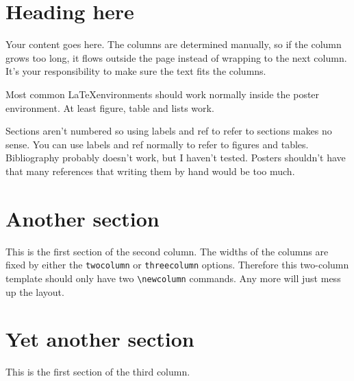 \documentclass[final]{beamer}
\author{First Author$^1$, \\ Second Author$^2$}
\institute{$^1$Some Institute, \url{email.address@institute}, \\ $^2$Another Institute}
\begin{document}
\begin{poster}

\newcolumn

\section{Heading here}
Your content goes here. The columns are determined manually, so if the column grows too long, it flows outside the page instead of wrapping to the next column. It's your responsibility to make sure the text fits the columns. 

Most common \LaTeX environments should work normally inside the poster environment. At least figure, table and lists work.

Sections aren't numbered so using labels and ref to refer to sections makes no sense. You can use labels and ref normally to refer to figures and tables. Bibliography probably doesn't work, but I haven't tested. Posters shouldn't have that many references that writing them by hand would be too much.


\newcolumn

\section{Another section}
This is the first section of the second column. The widths of the columns are fixed by either the \texttt{twocolumn} or \texttt{threecolumn} options. Therefore this two-column template should only have two \verb+\newcolumn+ commands. Any more will just mess up the layout. 


\newcolumn

\section{Yet another section}
This is the first section of the third column.


\end{poster}
\end{document}
